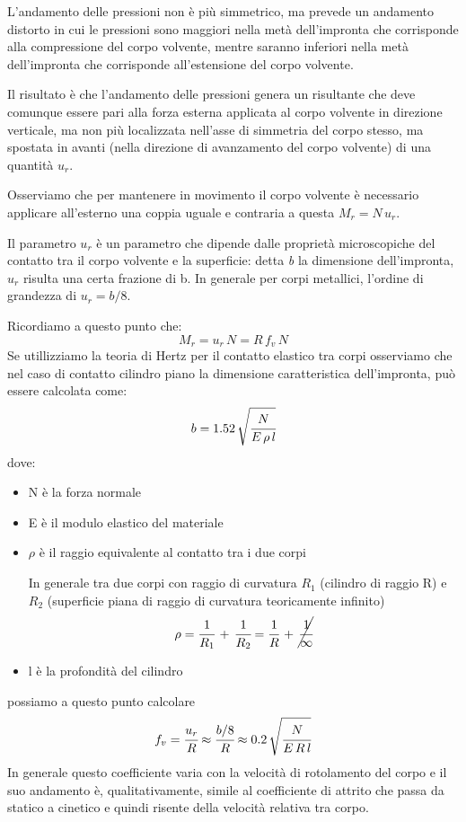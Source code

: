 L'andamento delle pressioni non è più simmetrico, ma prevede un andamento distorto in cui le pressioni sono maggiori nella metà dell'impronta che corrisponde alla compressione del corpo volvente, mentre saranno inferiori nella metà dell'impronta che corrisponde all'estensione del corpo volvente.

Il risultato è che l'andamento delle pressioni genera un risultante che deve comunque essere pari alla forza esterna applicata al corpo volvente in direzione verticale, ma non più localizzata nell'asse di simmetria del corpo stesso, ma spostata in avanti (nella direzione di avanzamento del corpo volvente) di una quantità $u_r$.

Osserviamo che per mantenere in movimento il corpo volvente è necessario applicare all'esterno una coppia uguale e contraria a questa $M_r = N\,u_r$.

Il parametro $u_r$ è un parametro che dipende dalle proprietà microscopiche del contatto tra il corpo volvente e la superficie: detta \emph{b} la dimensione dell'impronta, $u_r$ risulta una certa frazione di b. In generale per corpi metallici, l'ordine di grandezza di $u_r = b/8$.

Ricordiamo a questo punto che:
\[M_r = u_r\,N = R\,f_v\,N\]
Se utillizziamo la teoria di Hertz per il contatto elastico tra corpi osserviamo che nel caso di contatto cilindro piano la dimensione caratteristica dell'impronta, può essere calcolata come:
\[b = 1.52\,\sqrt{\cfrac{N}{E\,\rho\,l}}\]
dove:
\begin{itemize}
\item N è la forza normale
\item E è il modulo elastico del materiale
\item $\rho$ è il raggio equivalente al contatto tra i due corpi

In generale tra due corpi con raggio di curvatura $R_1$ (cilindro di raggio R) e $R_2$ (superficie piana di raggio di curvatura teoricamente infinito)
\[\rho = \cfrac{1}{R_1}\,+\,\cfrac{1}{R_2} = \cfrac{1}{R}\,+\,\cancel{\cfrac{1}{\infty}}\]
\item l è la profondità del cilindro
\end{itemize}

possiamo a questo punto calcolare
\[f_v = \cfrac{u_r}{R} \approx \cfrac{b/8}{R} \approx 0.2\,\sqrt{\cfrac{N}{E\,R\,l}}\]
In generale questo coefficiente varia con la velocità di rotolamento del corpo e il suo andamento è, qualitativamente, simile al coefficiente di attrito che passa da statico a cinetico e quindi risente della velocità relativa tra corpo.

